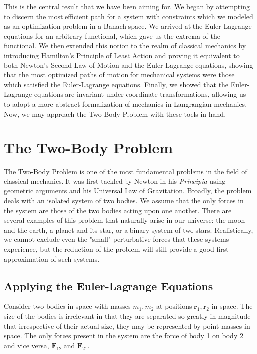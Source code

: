 \documentclass[10pt, psamsfonts]{amsart}
\theoremstyle{definition}
\theoremstyle{remark}
\numberwithin{equation}{section}
\begin{document}
This is the central result that we have been aiming for. We began by attempting to discern the most efficient path for a system with constraints which we modeled as an optimization problem in a Banach space. We arrived at the Euler-Lagrange equations for an arbitrary functional, which gave us the extrema of the functional. We then extended this notion to the realm of classical mechanics by introducing Hamilton's Principle of Least Action and proving it equivalent to both Newton's Second Law of Motion and the Euler-Lagrange equations, showing that the most optimized paths of motion for mechanical systems were those which satisfied the Euler-Lagrange equations. Finally, we showed that the Euler-Lagrange equations are invariant under coordinate transformations, allowing us to adopt a more abstract formalization of mechanics in Langrangian mechanics. Now, we may approach the Two-Body Problem with these tools in hand.

\section{The Two-Body Problem}
The Two-Body Problem is one of the most fundamental problems in the field of classical mechanics. It was first tackled by Newton in his \textit{Principia} using geometric arguments and his Universal Law of Gravitation. Broadly, the problem deals with an isolated system of two bodies. We assume that the only forces in the system are those of the two bodies acting upon one another. There are several examples of this problem that naturally arise in our universe: the moon and the earth, a planet and its star, or a binary system of two stars. Realistically, we cannot exclude even the "small" perturbative forces that these systems experience, but the reduction of the problem will still provide a good first approximation of such systems.

\subsection{Applying the Euler-Lagrange Equations}
Consider two bodies in space with masses $m_1, m_2$ at positions $\bm{r}_1, \bm{r}_2$ in space. The size of the bodies is irrelevant in that they are separated so greatly in magnitude that irrespective of their actual size, they may be represented by point masses in space. The only forces present in the system are the force of body 1 on body 2 and vice versa, $\bm{F}_{12} $ and $\bm{F}_{21}$. \\
\end{document}
